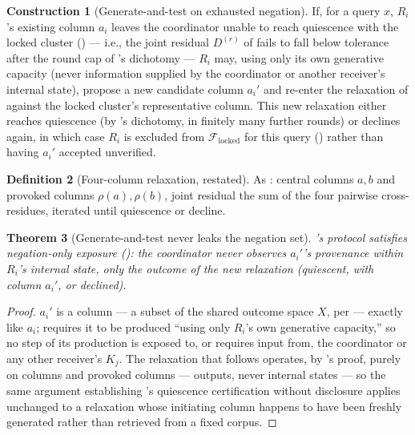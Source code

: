 \documentclass[11pt,twocolumn,a4paper]{article}
\theoremstyle{rdm}
\newtheorem{theorem}{Theorem}[section]
\theoremstyle{definition}
\newtheorem{definition}[theorem]{Definition}
\newtheorem{construction}[theorem]{Construction}
\theoremstyle{remark}
\newcommand{\Cands}{X}
\newcommand{\Know}{K}
\newcommand{\Rec}{R}
\newcommand{\Fed}{\mathcal{F}}
\newcommand{\dem}{D}
\begin{document}
\begin{construction}[Generate-and-test on exhausted negation]
\label{con:generate-test}
If, for a query $x$, $\Rec_i$'s existing column $a_i$ leaves the coordinator
unable to reach quiescence with the locked cluster
() — i.e., the joint residual
$\dem^{(r)}$ of  fails to fall below tolerance
after the round cap of \citet[Thm.~8.2]{sachikonye-accountable-compilation}'s
dichotomy — $\Rec_i$ may, using only its own generative capacity (never
information supplied by the coordinator or another receiver's internal
state), propose a new candidate column $a_i'$ and re-enter the relaxation
of  against the locked cluster's representative
column. This new relaxation either reaches quiescence (by
\citet[Thm.~8.2]{sachikonye-accountable-compilation}'s dichotomy, in
finitely many further rounds) or declines again, in which case $\Rec_i$ is
excluded from $\Fed_{\mathrm{locked}}$ for this query
() rather than having $a_i'$ accepted unverified.
\end{construction}

\begin{definition}[Four-column relaxation, restated]
\label{con:four-col-recap}
As \citet[Constr.~8.1]{sachikonye-accountable-compilation}: central columns
$a,b$ and provoked columns $\rho(a),\rho(b)$, joint residual the sum of the
four pairwise cross-residues, iterated until quiescence or decline.
\end{definition}

\begin{theorem}[Generate-and-test never leaks the negation set]
\label{thm:generate-safe}
's protocol satisfies negation-only exposure
(): the coordinator never observes $a_i'$'s
provenance within $\Rec_i$'s internal state, only the outcome of the new
relaxation (quiescent, with column $a_i'$, or declined).
\end{theorem}

\begin{proof}
$a_i'$ is a column — a subset of the shared outcome space $\Cands$, per
 — exactly like $a_i$; 
requires it to be produced ``using only $\Rec_i$'s own generative
capacity,'' so no step of its production is exposed to, or requires input
from, the coordinator or any other receiver's $\Know_j$. The relaxation
that follows operates, by 's proof,
purely on columns and provoked columns —
outputs, never internal states — so the same argument establishing
's quiescence certification without disclosure
applies unchanged to a relaxation whose initiating column happens to have
been freshly generated rather than retrieved from a fixed corpus.
\end{proof}
\end{document}
